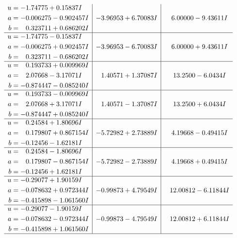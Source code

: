 \documentclass[1p]{elsarticle_modified}
\theoremstyle{definition}
\begin{document}
$$\begin{array}{c|c|c}
\begin{aligned}
u &= -1.74775 + 0.15837 I \\
a &= -0.006275 - 0.902457 I \\
b &= \phantom{-}0.323711 + 0.686202 I\end{aligned}
 & -3.96953 + 6.70083 I & \phantom{-}6.00000 - 9.43611 I \\ \hline\begin{aligned}
u &= -1.74775 - 0.15837 I \\
a &= -0.006275 + 0.902457 I \\
b &= \phantom{-}0.323711 - 0.686202 I\end{aligned}
 & -3.96953 - 6.70083 I & \phantom{-}6.00000 + 9.43611 I \\ \hline\begin{aligned}
u &= \phantom{-}0.193733 + 0.009969 I \\
a &= \phantom{-}2.07668 - 3.17071 I \\
b &= -0.874447 - 0.085240 I\end{aligned}
 & \phantom{-}1.40571 + 1.37087 I & \phantom{-}13.2500 - 6.0434 I \\ \hline\begin{aligned}
u &= \phantom{-}0.193733 - 0.009969 I \\
a &= \phantom{-}2.07668 + 3.17071 I \\
b &= -0.874447 + 0.085240 I\end{aligned}
 & \phantom{-}1.40571 - 1.37087 I & \phantom{-}13.2500 + 6.0434 I \\ \hline\begin{aligned}
u &= \phantom{-}0.24584 + 1.80696 I \\
a &= \phantom{-}0.179807 + 0.867154 I \\
b &= -0.12456 - 1.62181 I\end{aligned}
 & -5.72982 + 2.73889 I & \phantom{-}4.19668 - 0.49415 I \\ \hline\begin{aligned}
u &= \phantom{-}0.24584 - 1.80696 I \\
a &= \phantom{-}0.179807 - 0.867154 I \\
b &= -0.12456 + 1.62181 I\end{aligned}
 & -5.72982 - 2.73889 I & \phantom{-}4.19668 + 0.49415 I \\ \hline\begin{aligned}
u &= -0.29077 + 1.90159 I \\
a &= -0.078632 + 0.972344 I \\
b &= -0.415898 - 1.061560 I\end{aligned}
 & -0.99873 + 4.79549 I & \phantom{-}12.00812 - 6.11844 I \\ \hline\begin{aligned}
u &= -0.29077 - 1.90159 I \\
a &= -0.078632 - 0.972344 I \\
b &= -0.415898 + 1.061560 I\end{aligned}
 & -0.99873 - 4.79549 I & \phantom{-}12.00812 + 6.11844 I\\
 \hline 
 \end{array}$$\newpage
\end{document}
